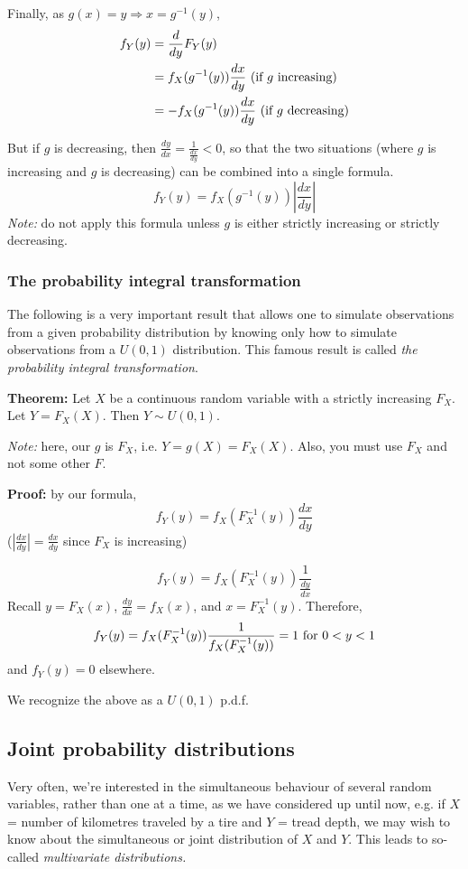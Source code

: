 \documentclass[12pt]{article}
\begin{document}
Finally, as $g(x) = y \Rightarrow x = g^{-1} (y)$,
\begin{align*}
    f_Y (y) &= \frac{d}{dy} F_Y (y) \\
        &= f_X (g^{-1} (y)) \frac{dx}{dy} \textnormal{ (if $g$ increasing)} \\
        &= - f_X (g^{-1}(y)) \frac{dx}{dy} \textnormal{ (if $g$ decreasing)}
\end{align*}

But if $g$ is decreasing, then $\frac{dy}{dx} = \frac{1}{\frac{dx}{dy}} < 0$, so that the two situations (where $g$ is increasing and $g$ is decreasing) can be combined into a single formula.
\[
    f_Y (y) = f_X (g^{-1} (y)) |\frac{dx}{dy}|
\]
\emph{Note:} do not apply this formula unless $g$ is either strictly increasing or strictly decreasing.

\subsubsection{The probability integral transformation}
The following is a very important result that allows one to simulate observations from a given probability distribution by knowing only how to simulate observations from a $U(0,1)$ distribution. This famous result is called \emph{the probability integral transformation}.

\textbf{Theorem:} Let $X$ be a continuous random variable with a strictly increasing $F_X$. Let $Y = F_X (X)$. Then $Y \sim U(0,1)$.

\emph{Note:} here, our $g$ is $F_X$, i.e. $Y = g(X) = F_X (X)$. Also, you must use $F_X$ and not some other $F$.

\textbf{Proof:} by our formula, 
\[
    f_Y (y) = f_X (F_X^{-1} (y)) \frac{dx}{dy} 
\]
($|\frac{dx}{dy}| = \frac{dx}{dy}$ since $F_X$ is increasing)

\[
    f_Y (y) = f_X (F_X^{-1}(y)) \frac{1}{\frac{dy}{dx}}
\]
Recall $y = F_X (x)$, $\frac{dy}{dx} = f_X (x)$, and $x=F_X^{-1} (y)$. Therefore,
\[
    f_Y (y) = f_X (F_X^{-1} (y)) \frac{1}{f_X (F_X^{-1} (y))} = 1 \textnormal{ for } 0 < y < 1
\]
and $f_Y (y) = 0$ elsewhere.

We recognize the above as a $U(0,1)$ p.d.f.

\subsection{Joint probability distributions}
Very often, we're interested in the simultaneous behaviour of several random variables, rather than one at a time, as we have considered up until now, e.g. if $X$ = number of kilometres traveled by a tire and $Y$ = tread depth, we may wish to know about the simultaneous or joint distribution of $X$ and $Y$. This leads to so-called \emph{multivariate distributions.}
\end{document}
